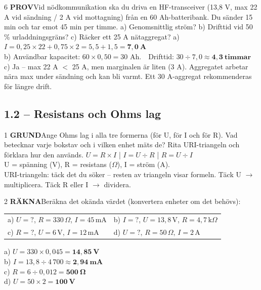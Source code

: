 \documentclass[a4paper,11pt,twoside]{book}
\newcommand{\qgrund}{\colorbox{greenpale}{\textcolor{greendark}{\headingfont\bfseries\tiny GRUND}}}
\newcommand{\qrakna}{\colorbox{bluepale}{\textcolor{bluedark}{\headingfont\bfseries\tiny RÄKNA}}}
\newcommand{\qprov}{\colorbox{redpale}{\textcolor{reddark}{\headingfont\bfseries\tiny PROV}}}
\begin{document}
\begin{facitblock}{6}
\qprov\quad Vid nödkommunikation ska du driva en HF-transceiver 
(13,8 V, max 22 A vid sändning / 2 A vid mottagning) från en 
60 Ah-batteribank. Du sänder 15 min och tar emot 45 min per timme. 
a) Genomsnittlig ström? b) Drifttid vid 50\,\% urladdningsgräns? 
c) Räcker ett 25 A nätaggregat?
\tcblower
a) $I = 0{,}25 \times 22 + 0{,}75 \times 2 = 5{,}5 + 1{,}5 = 
\mathbf{7{,}0\ A}$\\
b) Användbar kapacitet: $60 \times 0{,}50 = 30$ Ah.\ \ 
Drifttid: $30 \div 7{,}0 \approx \mathbf{4{,}3\ \text{timmar}}$\\
c) Ja – max 22 A $<$ 25 A, men marginalen är liten (3 A). 
Aggregatet arbetar nära max under sändning och kan bli varmt. 
Ett 30 A-aggregat rekommenderas för längre drift.
\end{facitblock}

\subsection*{1.2 – Resistans och Ohms lag}

\begin{facitblock}{1}
\qgrund\quad Ange Ohms lag i alla tre formerna (för U, för I och för R). 
Vad betecknar varje bokstav och i vilken enhet mäts de? Rita 
URI-triangeln och förklara hur den används.
\tcblower
$U = R \times I$ \quad | \quad $I = U \div R$ \quad | \quad $R = U \div I$\\
U = spänning (V), R = resistans ($\Omega$), I = ström (A).\\
URI-triangeln: täck det du söker – resten av triangeln visar formeln. 
Täck U $\rightarrow$ multiplicera. Täck R eller I $\rightarrow$ dividera.
\end{facitblock}

\begin{facitblock}{2}
\qrakna\quad Beräkna det okända värdet (konvertera enheter om det behövs):
\begin{center}
\begin{tabular}{ll}
a) $U = ?$, $R = 330\,\Omega$, $I = 45\,\text{mA}$ &
b) $I = ?$, $U = 13{,}8\,\text{V}$, $R = 4{,}7\,\text{k}\Omega$ \\[4pt]
c) $R = ?$, $U = 6\,\text{V}$, $I = 12\,\text{mA}$ &
d) $U = ?$, $R = 50\,\Omega$, $I = 2\,\text{A}$
\end{tabular}
\end{center}
\tcblower
a) $U = 330 \times 0{,}045 = \mathbf{14{,}85\ \text{V}}$\\
b) $I = 13{,}8 \div 4\,700 \approx \mathbf{2{,}94\ \text{mA}}$\\
c) $R = 6 \div 0{,}012 = \mathbf{500\ \Omega}$\\
d) $U = 50 \times 2 = \mathbf{100\ \text{V}}$
\end{facitblock}
\end{document}
